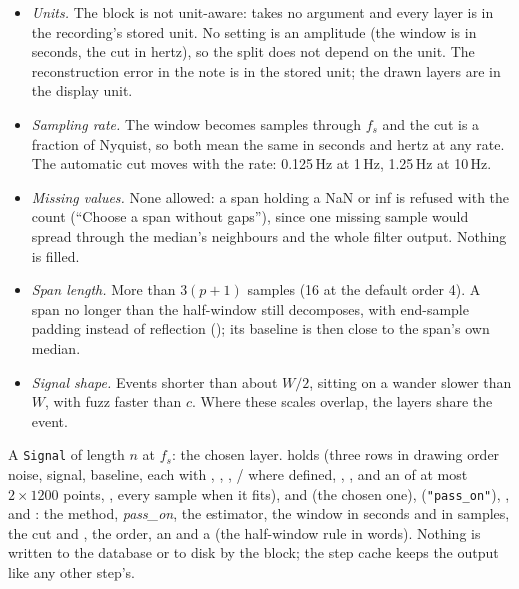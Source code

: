 \begin{itemize}
\item \emph{Units.} The block is not unit-aware:  takes no  argument and
  every layer is in the recording's stored unit. No setting is an amplitude (the window is in
  seconds, the cut in hertz), so the split does not depend on the unit. The reconstruction
  error in the note is in the stored unit; the drawn layers are in the display unit.
\item \emph{Sampling rate.} The window becomes samples through $f_s$ and the cut is a fraction
  of Nyquist, so both mean the same in seconds and hertz at any rate. The automatic cut moves
  with the rate: 0.125\,Hz at 1\,Hz, 1.25\,Hz at 10\,Hz.
\item \emph{Missing values.} None allowed: a span holding a NaN or inf is refused with the
  count (``Choose a span without gaps''), since one missing sample would spread through the
  median's neighbours and the whole filter output. Nothing is filled.
\item \emph{Span length.} More than $3(p+1)$ samples (16 at the default order 4). A span no
  longer than the half-window still decomposes, with end-sample padding instead of reflection
  (); its baseline is then
  close to the span's own median.
\item \emph{Signal shape.} Events shorter than about $W/2$, sitting on a wander slower than
  $W$, with fuzz faster than $c$. Where these scales overlap, the layers share the event.
\end{itemize}

A \texttt{Signal} of length $n$ at $f_s$: the chosen layer.  holds 
(three rows in drawing order noise, signal, baseline, each with , ,
, / where defined, , ,
 and an  of at most $2\times1200$ points,
, every sample when it fits),  and  (the
chosen one),  (\texttt{"pass\_on"}), , and
: the method, \emph{pass\_on}, the estimator, the window in seconds and in samples,
the cut and , the order, an  and a 
(the half-window rule in words). Nothing is written to the database or to disk by the block;
the step cache keeps the output like any other step's.

